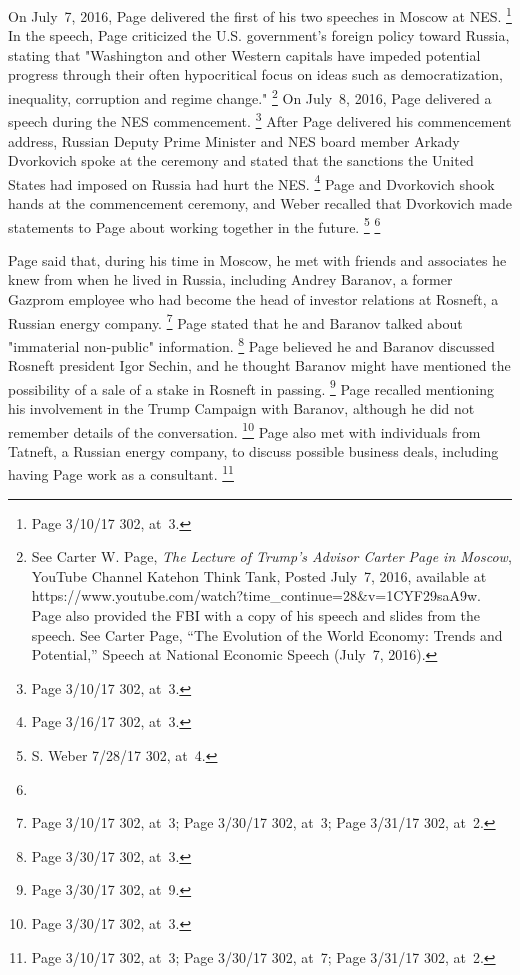 On July~7, 2016, Page delivered the first of his two speeches in Moscow at NES.%
\footnote{Page 3/10/17 302, at~3.}
In the speech, Page criticized the U.S. government's foreign policy toward Russia, stating that "Washington and other Western capitals have impeded potential progress through their often hypocritical focus on ideas such as democratization, inequality, corruption and regime change."%
\footnote{See Carter W. Page, \textit{The Lecture of Trump's Advisor Carter Page in Moscow}, YouTube Channel Katehon Think Tank, Posted July~7, 2016,
available at https://www.youtube.com/watch?time\_continue=28\&v=1CYF29saA9w.
Page also provided the FBI with a copy of his speech and slides from the speech.
See Carter Page, ``The Evolution of the World Economy: Trends and Potential,'' Speech at National Economic Speech (July~7, 2016).} %
On July~8, 2016, Page delivered a speech during the NES commencement.%
\footnote{Page 3/10/17 302, at~3.}
After Page delivered his commencement address, Russian Deputy Prime Minister and NES board member Arkady Dvorkovich spoke at the ceremony and stated that the sanctions the United States had imposed on Russia had hurt the NES\null.%
\footnote{Page 3/16/17 302, at~3.}
Page and Dvorkovich shook hands at the commencement ceremony, and Weber recalled that Dvorkovich made statements to Page about working together in the future.%
\footnote{S. Weber 7/28/17 302, at~4.}
\footnote{}

Page said that, during his time in Moscow, he met with friends and associates he knew from when he lived in Russia, including Andrey Baranov, a former Gazprom employee who had become the head of investor relations at Rosneft, a Russian energy company.%
\footnote{Page 3/10/17 302, at~3;
Page 3/30/17 302, at~3;
Page 3/31/17 302, at~2.}
Page stated that he and Baranov talked about "immaterial non-public" information.%
\footnote{Page 3/30/17 302, at~3.}
Page believed he and Baranov discussed Rosneft president Igor Sechin, and he thought Baranov might have mentioned the possibility of a sale of a stake in Rosneft in passing.%
\footnote{Page 3/30/17 302, at~9. }
Page recalled mentioning his involvement in the Trump Campaign with Baranov, although he did not remember details of the conversation.%
\footnote{ Page 3/30/17 302, at~3.}
Page also met with individuals from Tatneft, a Russian energy company, to discuss possible business deals, including having Page work as a consultant.%
\footnote{Page 3/10/17 302, at~3;
Page 3/30/17 302, at~7;
Page 3/31/17 302, at~2.}

